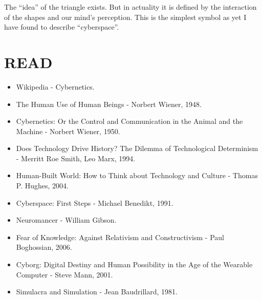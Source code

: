 \documentclass[letterpaper,12pt,english]{sphinxmanual}
\begin{document}
The ``idea'' of the triangle exists. But in actuality it is defined by the interaction of the shapes and our mind's perception. This is the simplest symbol as yet I have found to describe ``cyberspace''.


\section{READ}
\label{2011:read}\begin{itemize}
\item {} 
Wikipedia - Cybernetics.

\item {} 
The Human Use of Human Beings - Norbert Wiener, 1948.

\item {} 
Cybernetics: Or the Control and Communication in the Animal and the Machine - Norbert Wiener, 1950.

\item {} 
Does Technology Drive History? The Dilemma of Technological Determinism - Merritt Roe Smith, Leo Marx, 1994.

\item {} 
Human-Built World: How to Think about Technology and Culture - Thomas P. Hughes, 2004.

\item {} 
Cyberspace: First Steps - Michael Benedikt, 1991.

\item {} 
Neuromancer - William Gibson.

\item {} 
Fear of Knowledge: Against Relativism and Constructivism - Paul Boghossian, 2006.

\item {} 
Cyborg: Digital Destiny and Human Possibility in the Age of the Wearable Computer - Steve Mann, 2001.

\item {} 
Simulacra and Simulation - Jean Baudrillard, 1981.

\end{itemize}
\end{document}

